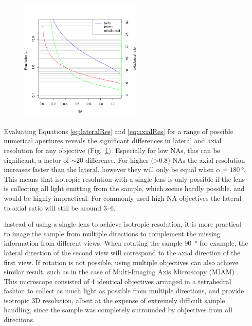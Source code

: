   \begin{figure}
    \centering
    \includegraphics[width=0.55\textwidth]{resolution}
    \label{fig:resolution}
  \end{figure}

  Evaluating Equations \ref{eq:lateralRes} and \ref{eq:axialRes} for a range of possible numerical apertures reveals the significant differences in lateral and axial resolution for any objective (Fig.~\ref{fig:resolution}). Especially for low NAs, this can be significant, a factor of $\sim$20 difference. For higher (>0.8) NAs the axial resolution increases faster than the lateral, however they will only be equal when $\alpha=\SI{180}{\degree}$. This means that isotropic resolution with a single lens is only possible if the lens is collecting all light emitting from the sample, which seems hardly possible, and would be highly impractical. For commonly used high NA objectives the lateral to axial ratio will still be around 3--6. 

  Instead of using a single lens to achieve isotropic resolution, it is more practical to image the sample from multiple directions to complement the missing information from different views. When rotating the sample \SI{90}{\degree} for example, the lateral direction of the second view will correspond to the axial direction of the first view. If rotation is not possible, using multiple objectives can also achieve similar result, such as in the case of Multi-Imaging Axis Microscopy (MIAM) \cite{swoger_multiple_2003,swoger_multi-view_2007}. This microscope consisted of 4 identical objectives arranged in a tetrahedral fashion to collect as much light as possible from multiple directions, and provide isotropic 3D resolution, albeit at the expense of extremely difficult sample handling, since the sample was completely surrounded by objectives from all directions. 

